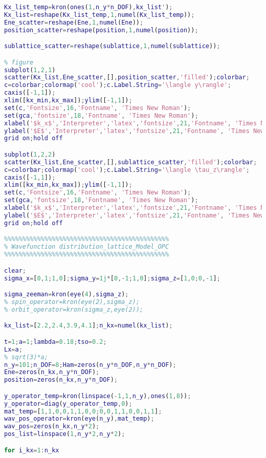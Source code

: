 \begin{lstlisting}[language=matlab]
Kx_list_temp=kron(ones(1,n_y*n_DOF),kx_list');
Kx_list=reshape(Kx_list_temp,1,numel(Kx_list_temp));
Ene_scatter=reshape(Ene,1,numel(Ene));
position_scatter=reshape(position,1,numel(position));

sublattice_scatter=reshape(sublattice,1,numel(sublattice));

% figure
subplot(1,2,1)
scatter(Kx_list,Ene_scatter,[],position_scatter,'filled');colorbar;
c=colorbar;colormap('cool');c.Label.String='\langle y\rangle';
caxis([-1,1]);
xlim([kx_min,kx_max]);ylim([-1,1]);
set(c,'Fontsize',16,'Fontname', 'Times New Roman');
set(gca,'fontsize',18,'Fontname', 'Times New Roman');
xlabel('$k_x$','Interpreter','latex','fontsize',21,'Fontname', 'Times New Roman');
ylabel('$E$','Interpreter','latex','fontsize',21,'Fontname', 'Times New Roman');
grid on;hold off

subplot(1,2,2)
scatter(Kx_list,Ene_scatter,[],sublattice_scatter,'filled');colorbar;
c=colorbar;colormap('cool');c.Label.String='\langle \tau_z\rangle';
caxis([-1,1]);
xlim([kx_min,kx_max]);ylim([-1,1]);
set(c,'Fontsize',16,'Fontname', 'Times New Roman');
set(gca,'fontsize',18,'Fontname', 'Times New Roman');
xlabel('$k_x$','Interpreter','latex','fontsize',21,'Fontname', 'Times New Roman');
ylabel('$E$','Interpreter','latex','fontsize',21,'Fontname', 'Times New Roman');
grid on;hold off

%%%%%%%%%%%%%%%%%%%%%%%%%%%%%%%%%%%%%%%%%%%%%
% Wavefunction distribution_lattice_Model_OPC
%%%%%%%%%%%%%%%%%%%%%%%%%%%%%%%%%%%%%%%%%%%%%

clear;
sigma_x=[0,1;1,0];sigma_y=1j*[0,-1;1,0];sigma_z=[1,0;0,-1];

sigma_zeeman=kron(eye(4),sigma_z);
% spin_operator=kron(eye(2),sigma_z);
% orbit_operator=kron(sigma_z,eye(2));

kx_list=[2.2,2.4,3.9,4.1];n_kx=numel(kx_list);

t=1;a=1;lambda=0.18;tso=0.2;
Lx=a;
% sqrt(3)*a;
n_y=101;n_DOF=8;Ham=zeros(n_y*n_DOF,n_y*n_DOF);
Ene=zeros(n_kx,n_y*n_DOF);
position=zeros(n_kx,n_y*n_DOF);

y_operator_temp=kron(linspace(-1,1,n_y),ones(1,8));
y_operator=diag(y_operator_temp,0);
mat_temp=[1,1,0,0,1,1,0,0;0,0,1,1,0,0,1,1];
wav_pos_operator=kron(eye(n_y),mat_temp);
wav_pos=zeros(n_kx,n_y*2);
pos_list=linspace(1,n_y*2,n_y*2);

for i_kx=1:n_kx


\end{lstlisting}
